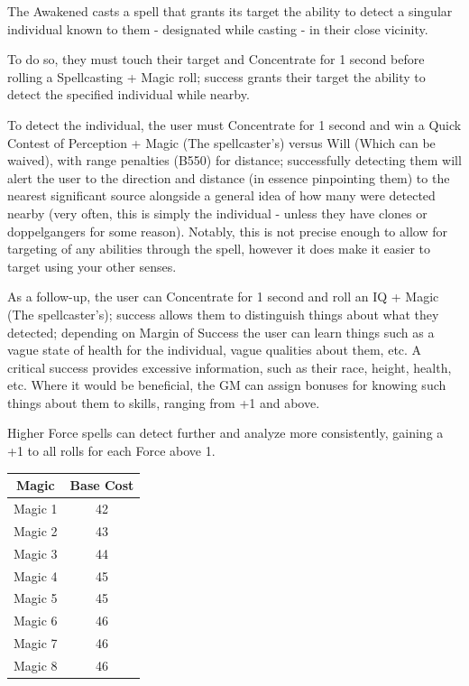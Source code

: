 \begin{multicols}{3}
	The Awakened casts a spell that grants its target the ability to detect a singular individual known to them - designated while casting - in their close vicinity.
	
	To do so, they must touch their target and Concentrate for 1 second before rolling a Spellcasting + Magic roll; success grants their target the ability to detect the specified individual while nearby.
	
	To detect the individual, the user must Concentrate for 1 second and win a Quick Contest of Perception + Magic (The spellcaster's) versus Will (Which can be waived), with range penalties (B550) for distance; successfully detecting them will alert the user to the direction and distance (in essence pinpointing them) to the nearest significant source alongside a general idea of how many were detected nearby (very often, this is simply the individual - unless they have clones or doppelgangers for some reason).  Notably, this is not precise enough to allow for targeting of any abilities through the spell, however it does make it easier to target using your other senses.
	
	As a follow-up, the user can Concentrate for 1 second and roll an IQ + Magic (The spellcaster's); success allows them to distinguish things about what they detected; depending on Margin of Success the user can learn things such as a vague state of health for the individual, vague qualities about them, etc. A critical success provides excessive information, such as their race, height, health, etc. Where it would be beneficial, the GM can assign bonuses for knowing such things about them to skills, ranging from +1 and above.
	
	Higher Force spells can detect further and analyze more consistently, gaining a +1 to all rolls for each Force above 1.		
	
	\begin{center}
		\begin{tabular}{|c|c|}
			\hline
			Magic & Base Cost \\
			\hline
			\hline
			Magic 1 & 42 \\
			Magic 2 & 43 \\
			Magic 3 & 44 \\
			Magic 4 & 45 \\
			Magic 5 & 45 \\
			Magic 6 & 46 \\
			Magic 7 & 46 \\
			Magic 8 & 46 \\
			\hline
		\end{tabular}
	\end{center} 
	

\end{multicols}

